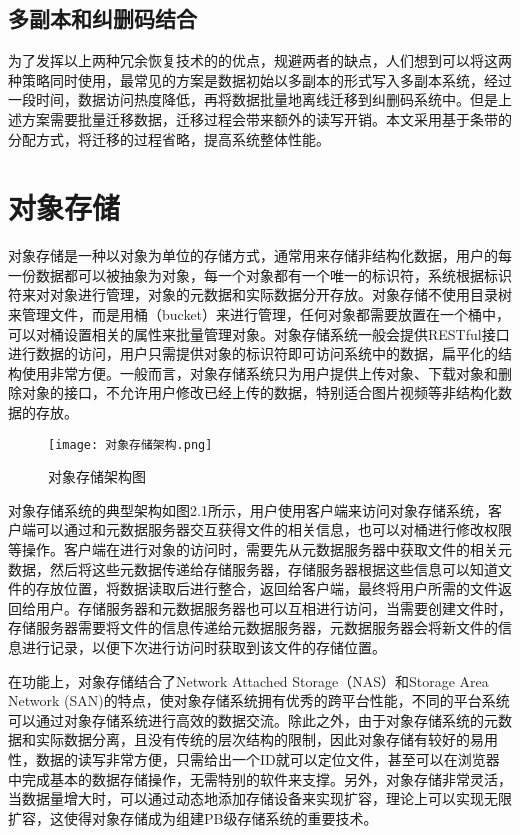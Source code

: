 \subsection{多副本和纠删码结合}%
为了发挥以上两种冗余恢复技术的的优点，规避两者的缺点，人们想到可以将这两种策略同时使用，最常见的方案是数据初始以多副本的形式写入多副本系统，经过一段时间，数据访问热度降低，再将数据批量地离线迁移到纠删码系统中。但是上述方案需要批量迁移数据，迁移过程会带来额外的读写开销。本文采用基于条带的分配方式，将迁移的过程省略，提高系统整体性能。

\section{对象存储}%
对象存储是一种以对象为单位的存储方式，通常用来存储非结构化数据，用户的每一份数据都可以被抽象为对象，每一个对象都有一个唯一的标识符，系统根据标识符来对对象进行管理，对象的元数据和实际数据分开存放。对象存储不使用目录树来管理文件，而是用桶（bucket）来进行管理，任何对象都需要放置在一个桶中，可以对桶设置相关的属性来批量管理对象。对象存储系统一般会提供RESTful接口进行数据的访问，用户只需提供对象的标识符即可访问系统中的数据，扁平化的结构使用非常方便。一般而言，对象存储系统只为用户提供上传对象、下载对象和删除对象的接口，不允许用户修改已经上传的数据，特别适合图片视频等非结构化数据的存放。
\begin{figure}
    \centering
    \texttt{[image: 对象存储架构.png]}
    \caption{对象存储架构图}
\end{figure}

对象存储系统的典型架构如图2.1所示，用户使用客户端来访问对象存储系统，客户端可以通过和元数据服务器交互获得文件的相关信息，也可以对桶进行修改权限等操作。客户端在进行对象的访问时，需要先从元数据服务器中获取文件的相关元数据，然后将这些元数据传递给存储服务器，存储服务器根据这些信息可以知道文件的存放位置，将数据读取后进行整合，返回给客户端，最终将用户所需的文件返回给用户。存储服务器和元数据服务器也可以互相进行访问，当需要创建文件时，存储服务器需要将文件的信息传递给元数据服务器，元数据服务器会将新文件的信息进行记录，以便下次进行访问时获取到该文件的存储位置。

在功能上，对象存储结合了Network Attached Storage\cite{33}（NAS）和Storage Area Network\cite{34} (SAN)的特点，使对象存储系统拥有优秀的跨平台性能\cite{35}，不同的平台系统可以通过对象存储系统进行高效的数据交流。除此之外，由于对象存储系统的元数据和实际数据分离，且没有传统的层次结构的限制，因此对象存储有较好的易用性，数据的读写非常方便，只需给出一个ID就可以定位文件，甚至可以在浏览器中完成基本的数据存储操作，无需特别的软件来支撑。另外，对象存储非常灵活，当数据量增大时，可以通过动态地添加存储设备来实现扩容，理论上可以实现无限扩容，这使得对象存储成为组建PB级存储系统的重要技术。

